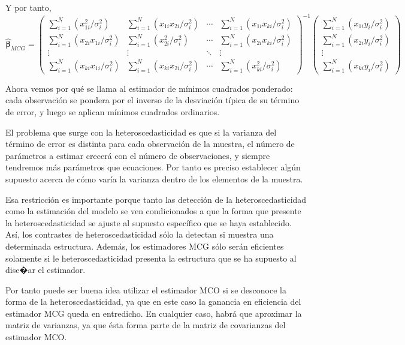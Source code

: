 Y por tanto, 
\[
\hat{\boldsymbol{\beta}}_{MCG}=\left(\begin{array}{cccc}
\sum_{i=1}^{N}\left(x_{1i}^{2}/\sigma_{i}^{2}\right) & \sum_{i=1}^{N}\left(x_{1i}x_{2i}/\sigma_{i}^{2}\right) & \cdots & \sum_{i=1}^{N}\left(x_{1i}x_{ki}/\sigma_{i}^{2}\right)\\
\sum_{i=1}^{N}\left(x_{2i}x_{1i}/\sigma_{i}^{2}\right) & \sum_{i=1}^{N}\left(x_{2i}^{2}/\sigma_{i}^{2}\right) & \cdots & \sum_{i=1}^{N}\left(x_{2i}x_{ki}/\sigma_{i}^{2}\right)\\
\vdots & \vdots & \ddots & \vdots\\
\sum_{i=1}^{N}\left(x_{ki}x_{1i}/\sigma_{i}^{2}\right) & \sum_{i=1}^{N}\left(x_{ki}x_{2i}/\sigma_{i}^{2}\right) & \cdots & \sum_{i=1}^{N}\left(x_{ki}^{2}/\sigma_{i}^{2}\right)
\end{array}\right)^{-1}\left(\begin{array}{c}
\sum_{i=1}^{N}\left(x_{1i}y_{i}/\sigma_{i}^{2}\right)\\
\sum_{i=1}^{N}\left(x_{2i}y_{i}/\sigma_{i}^{2}\right)\\
\vdots\\
\sum_{i=1}^{N}\left(x_{ki}y_{i}/\sigma_{i}^{2}\right)
\end{array}\right)
\]


Ahora vemos por qu\'e se llama al estimador de m\'inimos cuadrados ponderado:
cada observaci\'on se pondera por el inverso de la desviaci\'on t\'ipica
de su t\'ermino de error, y luego se aplican m\'inimos cuadrados ordinarios.

El problema que surge con la heteroscedasticidad es que si la varianza
del t\'ermino de error es distinta para cada observaci\'on de la muestra,
el n\'umero de par\'ametros a estimar crecer\'a con el n\'umero de observaciones,
y siempre tendremos m\'as par\'ametros que ecuaciones. Por tanto es preciso
establecer alg\'un supuesto acerca de c\'omo var\'ia la varianza dentro
de los elementos de la muestra.

Esa restricci\'on es importante porque tanto las detecci\'on de la heteroscedasticidad
como la estimaci\'on del modelo se ven condicionados a que la forma
que presente la heteroscedasticidad se ajuste al supuesto espec\'ifico
que se haya establecido. As\'i, los contrastes de heteroscedasticidad
s\'olo la detectan si muestra una determinada estructura. Adem\'as, los
estimadores MCG s\'olo ser\'an eficientes solamente si le heteroscedasticidad
presenta la estructura que se ha supuesto al dise�ar el estimador.

Por tanto puede ser buena idea utilizar el estimador MCO si se desconoce
la forma de la heteroscedasticidad, ya que en este caso la ganancia
en eficiencia del estimador MCG queda en entredicho. En cualquier
caso, habr\'a que aproximar la matriz de varianzas, ya que \'esta forma
parte de la matriz de covarianzas del estimador MCO.

